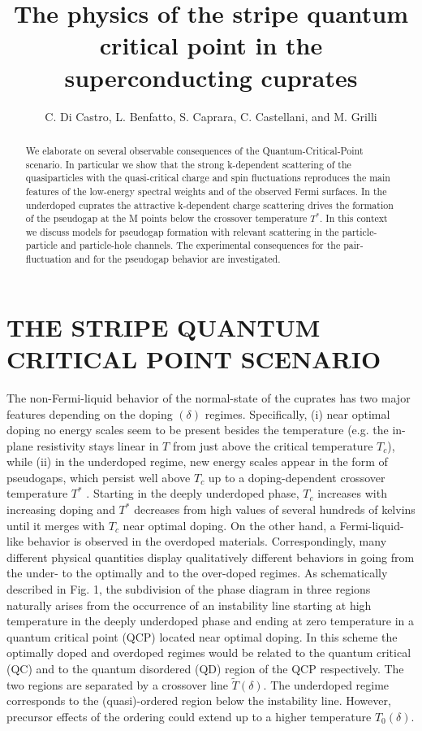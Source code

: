 \documentclass[twoside]{article}
\title{The physics of the stripe quantum critical point in 
the superconducting cuprates}
\author{C. Di Castro, L. Benfatto, S. Caprara, 
C. Castellani, and M. Grilli\address{INFM and Dipartimento di Fisica
Universit\`a di Roma ``La Sapienza'' \\ 
        00185 Rome, Italy}}
\begin{document}
\begin{abstract}

We elaborate on several observable consequences of the Quantum-Critical-Point 
scenario. In particular we show that
the strong k-dependent scattering of the quasiparticles with the 
quasi-critical charge and spin fluctuations reproduces the main features of 
the low-energy spectral weights and  of the observed Fermi surfaces. In the 
underdoped cuprates the attractive k-dependent charge scattering drives the 
formation of the pseudogap at the M points below the crossover temperature 
$T^*$. In this context we discuss models for pseudogap formation with 
relevant scattering  in the particle-particle and particle-hole channels. The 
experimental consequences for the pair-fluctuation and for the 
pseudogap behavior are investigated. 
\vspace{1pc}
\end{abstract}

\maketitle

\section{THE STRIPE QUANTUM CRITICAL POINT SCENARIO}

The non-Fermi-liquid behavior of the normal-state of the  cuprates has two 
major features depending on the doping $(\delta)$ regimes. Specifically, 
(i) near optimal doping no energy scales seem to be present besides the 
temperature (e.g. the in-plane resistivity stays linear in $T$ from just 
above  the critical temperature $T_c$), while (ii) in the underdoped regime, 
new energy 
scales appear in the form of pseudogaps, which persist well above $T_c$ up to 
a doping-dependent crossover temperature $T^*$ \cite{timusk}. Starting in the 
deeply underdoped phase, $T_c$ increases with increasing doping and  $T^*$ 
decreases from high values of several hundreds of kelvins until it merges 
with $T_c$ near optimal doping. On the other hand, a Fermi-liquid-like 
behavior is observed in the overdoped materials. Correspondingly, 
many different physical quantities display qualitatively different 
behaviors in going from the under- to the optimally and to the over-doped 
regimes. As schematically described in Fig. 1, the subdivision of the phase 
diagram in three regions naturally arises from the occurrence of an 
instability line starting at high temperature in the deeply underdoped phase
and ending at zero temperature in a quantum critical point (QCP) located near 
optimal doping. 
In this scheme the optimally doped and overdoped regimes would be related to 
the quantum critical (QC) and to the quantum disordered (QD) region of the 
QCP respectively. The two regions are separated by a crossover line 
$\tilde{T}(\delta)$. The underdoped regime corresponds to the (quasi)-ordered 
region below the instability line. However, precursor effects of the ordering 
could extend up to a higher temperature $T_0(\delta)$.
\end{document}
